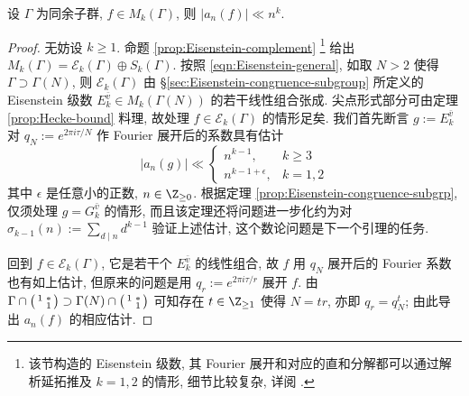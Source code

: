 \begin{theorem}\label{prop:Hecke-bound-cong}
	设 $\Gamma$ 为同余子群, $f \in M_k(\Gamma)$, 则 $|a_n(f)| \ll n^k$.
\end{theorem}
\begin{proof}
	无妨设 $k \geq 1$. 命题 \ref{prop:Eisenstein-complement} \footnote{该节构造的 Eisenstein 级数, 其 Fourier 展开和对应的直和分解都可以通过解析延拓推及 $k = 1, 2$ 的情形, 细节比较复杂, 详阅 \cite[\S 7.2]{Mi89}.}
	给出 $M_k(\Gamma) = \mathcal{E}_k(\Gamma) \oplus S_k(\Gamma)$. 按照 \eqref{eqn:Eisenstein-general}, 如取 $N > 2$ 使得 $\Gamma \supset \Gamma(N)$, 则 $\mathcal{E}_k(\Gamma)$ 由 \S\ref{sec:Eisenstein-congruence-subgroup} 所定义的 Eisenstein 级数 $E_k^{\bar{v}} \in M_k(\Gamma(N))$ 的若干线性组合张成. 尖点形式部分可由定理 \ref{prop:Hecke-bound} 料理, 故处理 $f \in \mathcal{E}_k(\Gamma)$ 的情形足矣. 我们首先断言 $g := E_k^{\bar{v}}$ 对 $q_N := e^{2\pi i\tau/N}$ 作 Fourier 展开后的系数具有估计
	\[ |a_n(g)| \ll \begin{cases}
		n^{k-1}, & k \geq 3 \\
		n^{k-1+\epsilon}, & k =1,2
	\end{cases} \]
	其中 $\epsilon$ 是任意小的正数, $n \in \Z_{\geq 0}$. 根据定理 \ref{prop:Eisenstein-congruence-subgrp}, 仅须处理 $g = G_k^{\bar{v}}$ 的情形, 而且该定理还将问题进一步化约为对 $\sigma_{k-1}(n) := \sum_{d \mid n} d^{k-1}$ 验证上述估计, 这个数论问题是下一个引理的任务.
	
	回到 $f \in \mathcal{E}_k(\Gamma)$, 它是若干个 $E_k^{\bar{v}}$ 的线性组合, 故 $f$ 用 $q_N$ 展开后的 Fourier 系数也有如上估计, 但原来的问题是用 $q_r := e^{2\pi i\tau/r}$ 展开 $f$. 由 $\Gamma \cap \bigl(\begin{smallmatrix} 1 & * \\  & 1 \end{smallmatrix}\bigr) \supset \Gamma(N) \cap \bigl(\begin{smallmatrix} 1 & * \\  & 1 \end{smallmatrix}\bigr)$ 可知存在 $t \in \Z_{\geq 1}$ 使得 $N = tr$, 亦即 $q_r = q_N^t$; 由此导出 $a_n(f)$ 的相应估计.
\end{proof}

